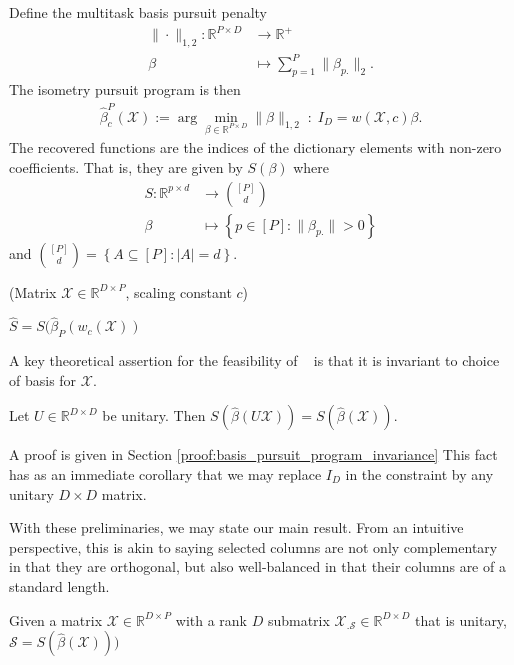 Define the multitask basis pursuit penalty  %
\begin{align}
\label{eq:bp}
\| \cdot \|_{1,2}: \mathbb R^{P \times D} &\to \mathbb R^+ \\ 
\beta &\mapsto  \sum_{p=1}^P  \|\beta_{p.}\|_2.
\end{align}
The isometry pursuit program is then
\begin{align}
\label{prog:isometry_pursuit}
\widehat \beta^{P}_c (\mathcal X)  := \arg \min_{\beta \in \mathbb R^{P \times D}} \| \beta \|_{1,2} \; : \; I_D = w ({ \mathcal X}, c) \beta.
\end{align}
The recovered functions are the indices of the dictionary elements with non-zero coefficients.
That is, they are given by $S(\beta)$ where 
\begin{align}
S: \mathbb{R}^{p \times d} &\to \binom{[P]}{d} \\
\beta &\mapsto \left\{ p \in [P] :  \|\beta_{p.}\| > 0 \right\}
\end{align}
and $\binom{[P]}{d} = \left\{ A \subseteq [P] : \left|A\right| = d \right\}$. 
\begin{algorithm}[H]
\caption{\isometrypursuit(Matrix $\mathcal X \in \mathbb R^{D\times P}$, scaling constant $c$)}
\begin{algorithmic}[1]
 $\widehat S= S (\widehat \beta_P(w_c(\mathcal X))$ 
\end{algorithmic}
\end{algorithm}

A key theoretical assertion for the feasibility of \isometrypursuit~ is that it is invariant to choice of basis for $\mathcal X$.
\begin{proposition}
\label{prop:basis_pursuit_selection_invariance}
Let $U \in \mathbb R^{D \times D}$ be unitary.
 Then $S(\widehat \beta  (U \mathcal X)) = S(\widehat \beta (\mathcal X))$.
\end{proposition}
A proof is given in Section \ref{proof:basis_pursuit_program_invariance}
This fact has as an immediate corollary that we may replace $I_D$ in the constraint by any unitary $D \times D$ matrix.

With these preliminaries, we may state our main result.
From an intuitive perspective, this is akin to saying selected columns are not only complementary in that they are orthogonal, but also well-balanced in that their columns are of a standard length.
\begin{proposition}
\label{prop:unitary_selection}
Given a matrix $\mathcal X \in \mathbb R^{D \times P}$ with a rank $D$ submatrix $\mathcal X_{.\mathcal S} \in \mathbb R^{D \times D}$ that is unitary, $\mathcal S = S(\widehat{\beta} (\mathcal X)))$
 \end{proposition}
 
